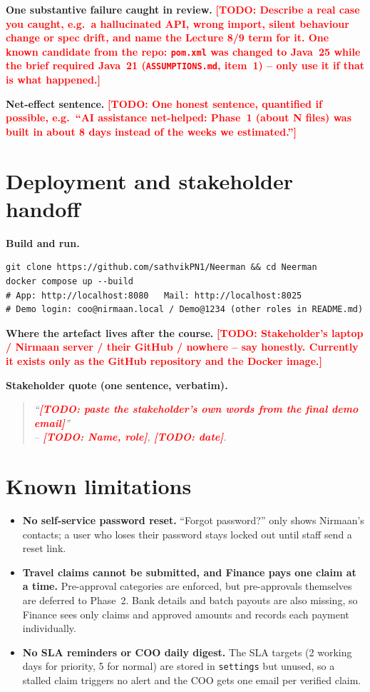 \documentclass[11pt,a4paper]{article}
\newcommand{\todo}[1]{\textcolor{red}{\textbf{[TODO: #1]}}}
\begin{document}
\textbf{One substantive failure caught in review.}
\todo{Describe a real case you caught, e.g.\ a hallucinated API, wrong import, silent behaviour change or spec drift, and name the Lecture 8/9 term for it. One known candidate from the repo: \texttt{pom.xml} was changed to Java~25 while the brief required Java~21 (\texttt{ASSUMPTIONS.md}, item~1) -- only use it if that is what happened.}

\textbf{Net-effect sentence.}
\todo{One honest sentence, quantified if possible, e.g.\ ``AI assistance net-helped: Phase~1 (about N files) was built in about 8 days instead of the weeks we estimated.''}

\section{Deployment and stakeholder handoff}

\textbf{Build and run.}

\begin{verbatim}
git clone https://github.com/sathvikPN1/Neerman && cd Neerman
docker compose up --build
# App: http://localhost:8080   Mail: http://localhost:8025
# Demo login: coo@nirmaan.local / Demo@1234 (other roles in README.md)
\end{verbatim}

\textbf{Where the artefact lives after the course.}
\todo{Stakeholder's laptop / Nirmaan server / their GitHub / nowhere -- say honestly. Currently it exists only as the GitHub repository and the Docker image.}

\textbf{Stakeholder quote (one sentence, verbatim).}

\begin{quote}
\textit{
``\todo{paste the stakeholder's own words from the final demo email}''\\
-- \todo{Name, role}, \todo{date}.
}
\end{quote}

\section{Known limitations}

\begin{itemize}[leftmargin=*,nosep]
    \item \textbf{No self-service password reset.} ``Forgot password?'' only shows Nirmaan's contacts; a user who loses their password stays locked out until staff send a reset link.
    \item \textbf{Travel claims cannot be submitted, and Finance pays one claim at a time.} Pre-approval categories are enforced, but pre-approvals themselves are deferred to Phase~2. Bank details and batch payouts are also missing, so Finance sees only claims and approved amounts and records each payment individually.
    \item \textbf{No SLA reminders or COO daily digest.} The SLA targets (2 working days for priority, 5 for normal) are stored in \texttt{settings} but unused, so a stalled claim triggers no alert and the COO gets one email per verified claim.
\end{itemize}
\end{document}
